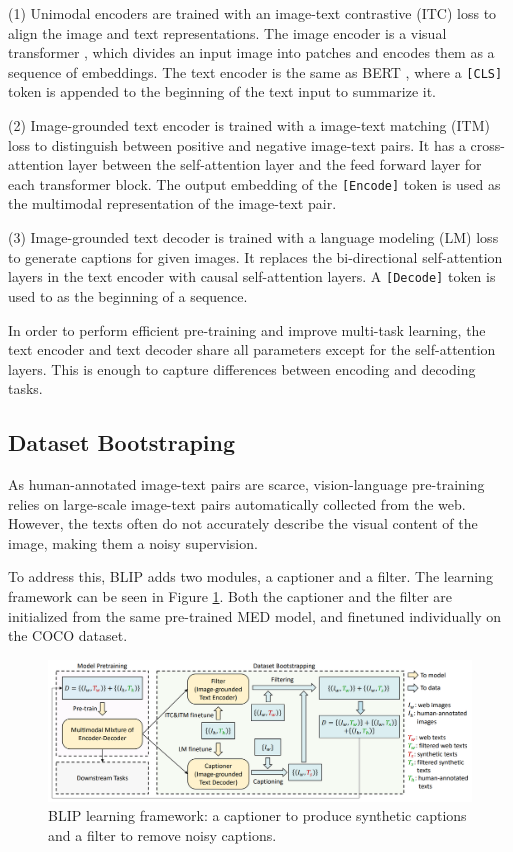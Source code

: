 \documentclass[11pt]{article}
\begin{document}
(1) Unimodal encoders are trained with an image-text contrastive (ITC) loss to align the image and text representations. The image encoder is a visual transformer \cite{dosovitskiy2020image}, which divides an input image into patches and encodes them as a sequence of embeddings. The text encoder is the same as BERT \cite{devlin2018bert}, where a \texttt{[CLS]} token is appended to the beginning of the text input to summarize it.

(2) Image-grounded text encoder is trained with a image-text matching (ITM) loss to distinguish between positive and negative image-text pairs. It has a cross-attention layer between the self-attention layer and the feed forward layer for each transformer block. The output embedding of the \texttt{[Encode]} token is used as the multimodal representation of the image-text pair.

(3) Image-grounded text decoder is trained with a language modeling (LM) loss to generate captions for given images. It replaces the bi-directional self-attention layers in the text encoder with causal self-attention layers. A \texttt{[Decode]} token is used to as the beginning of a sequence.

In order to perform efficient pre-training and improve multi-task learning, the text encoder and text decoder share all parameters except for the self-attention layers. This is enough to capture differences between encoding and decoding tasks.

\subsection{Dataset Bootstraping}

As human-annotated image-text pairs are scarce, vision-language pre-training relies on large-scale image-text pairs automatically collected from the web. However, the texts often do not accurately describe the visual content of the image, making them a noisy supervision. 

To address this, BLIP adds two modules, a captioner and a filter. The learning framework can be seen in Figure \ref{fig:blip_framework}. Both the captioner and the filter are initialized from the same pre-trained MED model, and finetuned individually on the COCO \cite{lin2014microsoft} dataset.

\begin{figure}
    \centering
    \includegraphics[width=\linewidth]{blip_framework.png}
    \caption{BLIP learning framework: a captioner to produce synthetic captions and a filter to remove noisy captions.}
    \label{fig:blip_framework}
\end{figure}
\end{document}
